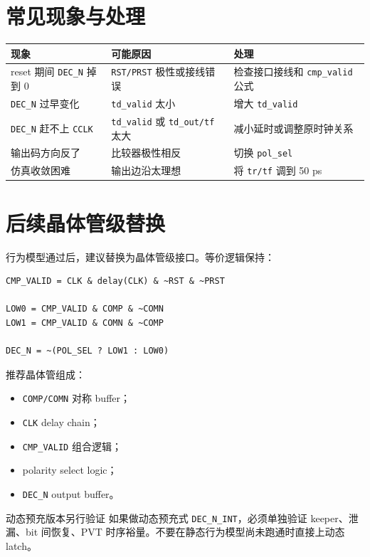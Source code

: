 \documentclass[11pt,a4paper,UTF8]{ctexart}
\begin{document}
\section{常见现象与处理}

\begin{center}
\begin{tabularx}{\textwidth}{X X X}
\toprule
\textbf{现象} & \textbf{可能原因} & \textbf{处理} \\
\midrule
reset 期间 \texttt{DEC\_N} 掉到 0 & \texttt{RST/PRST} 极性或接线错误 & 检查接口接线和 \texttt{cmp\_valid} 公式 \\
\texttt{DEC\_N} 过早变化 & \texttt{td\_valid} 太小 & 增大 \texttt{td\_valid} \\
\texttt{DEC\_N} 赶不上 \texttt{CCLK} & \texttt{td\_valid} 或 \texttt{td\_out/tf} 太大 & 减小延时或调整原时钟关系 \\
输出码方向反了 & 比较器极性相反 & 切换 \texttt{pol\_sel} \\
仿真收敛困难 & 输出边沿太理想 & 将 \texttt{tr/tf} 调到 50 ps \\
\bottomrule
\end{tabularx}
\end{center}

\section{后续晶体管级替换}

行为模型通过后，建议替换为晶体管级接口。等价逻辑保持：

\begin{lstlisting}[style=va,numbers=none]
CMP_VALID = CLK & delay(CLK) & ~RST & ~PRST

LOW0 = CMP_VALID & COMP & ~COMN
LOW1 = CMP_VALID & COMN & ~COMP

DEC_N = ~(POL_SEL ? LOW1 : LOW0)
\end{lstlisting}

推荐晶体管组成：

\begin{itemize}
    \item \texttt{COMP/COMN} 对称 buffer；
    \item \texttt{CLK} delay chain；
    \item \texttt{CMP\_VALID} 组合逻辑；
    \item polarity select logic；
    \item \texttt{DEC\_N} output buffer。
\end{itemize}

\begin{riskbox}{动态预充版本另行验证}
如果做动态预充式 \texttt{DEC\_N\_INT}，必须单独验证 keeper、泄漏、bit 间恢复、PVT 时序裕量。不要在静态行为模型尚未跑通时直接上动态 latch。
\end{riskbox}
\end{document}
